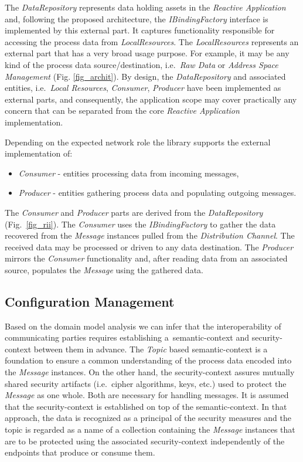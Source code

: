 \documentclass{jacsart}
\begin{document}
The \emph{DataRepository} represents data holding assets in the \emph{Reactive Application} and, following the proposed architecture, the \emph{IBindingFactory} interface is implemented by this external part. It captures functionality responsible for accessing the process data from \emph{LocalResources}. The \emph{LocalResources} represents an external part that has a very broad usage purpose. For example, it may be any kind of the process data source/destination, i.e.~\emph{Raw Data} or \emph{Address Space Management} (Fig. \ref*{fig_archit}). By design, the \emph{DataRepository} and associated entities, i.e.~\emph{Local Resources}, \emph{Consumer}, \emph{Producer} have been implemented as external parts, and consequently, the application scope may cover practically any concern that can be separated from the core \emph{Reactive Application} implementation.

Depending on the expected network role the library supports the external implementation of:

\begin{itemize}
  \item \emph{Consumer} - entities processing data from incoming messages,
  \item \emph{Producer} - entities gathering process data and populating outgoing messages.
\end{itemize}

The \emph{Consumer} and \emph{Producer} parts are derived from the \emph{DataRepository} (Fig.~\ref*{fig_rii}). The \emph{Consumer} uses the \emph{IBindingFactory} to gather the data recovered from the \emph{Message} instances pulled from the \emph{Distribution Channel}. The received data may be processed or driven to any data destination. The \emph{Producer} mirrors the \emph{Consumer} functionality and, after reading data from an associated source, populates the \emph{Message} using the gathered data.

\subsection{Configuration Management}\label{configuration-management}

Based on the domain model analysis we can infer that the interoperability of communicating parties requires establishing a~semantic-context and security-context between them in advance. The \emph{Topic} based semantic-context is a foundation to ensure a common understanding of the process data encoded into the \emph{Message} instances. On the other hand, the security-context assures mutually shared security artifacts (i.e.~cipher algorithms, keys, etc.) used to protect the \emph{Message} as one whole. Both are necessary for handling messages. It is assumed that the security-context is established on top of the semantic-context. In that approach, the data is recognized as a principal of the security measures and the topic is regarded as a name of a collection containing the \emph{Message} instances that are to be protected using the associated security-context independently of the endpoints that produce or consume them.
\end{document}
